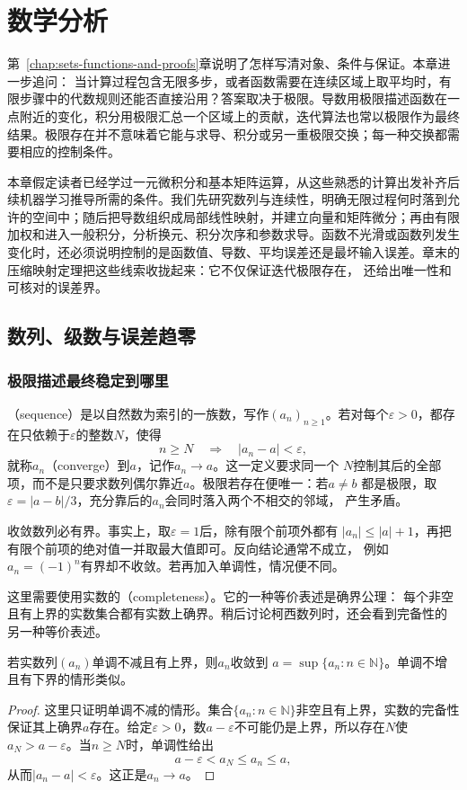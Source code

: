 \chapter{数学分析}
\label{chap:mathematical-analysis}

第~\ref{chap:sets-functions-and-proofs}章说明了怎样写清对象、条件与保证。本章进一步追问： 当计算过程包含无限多步，或者函数需要在连续区域上取平均时，有限步骤中的代数规则还能否直接沿用？答案取决于极限。导数用极限描述函数在一点附近的变化，积分用极限汇总一个区域上的贡献，迭代算法也常以极限作为最终结果。极限存在并不意味着它能与求导、积分或另一重极限交换；每一种交换都需要相应的控制条件。

本章假定读者已经学过一元微积分和基本矩阵运算，从这些熟悉的计算出发补齐后续机器学习推导所需的条件。我们先研究数列与连续性，明确无限过程何时落到允许的空间中；随后把导数组织成局部线性映射，并建立向量和矩阵微分；再由有限加权和进入一般积分，分析换元、积分次序和参数求导。函数不光滑或函数列发生变化时，还必须说明控制的是函数值、导数、平均误差还是最坏输入误差。章末的压缩映射定理把这些线索收拢起来：它不仅保证迭代极限存在， 还给出唯一性和可核对的误差界。
\section{数列、级数与误差趋零}
\label{sec:analysis-sequences-series-errors}
\subsection{极限描述最终稳定到哪里}

（sequence）是以自然数为索引的一族数，写作$(a_n)_{n\geq 1}$。若对每个$\varepsilon>0$，都存在只依赖于$\varepsilon$的整数$N$，使得
\[   n\geq N\quad\Longrightarrow\quad |a_n-a|<\varepsilon, \]
就称$a_n$（converge）到$a$，记作$a_n\to a$。这一定义要求同一个 $N$控制其后的全部项，而不是只要求数列偶尔靠近$a$。极限若存在便唯一：若$a\neq b$ 都是极限，取$\varepsilon=|a-b|/3$，充分靠后的$a_n$会同时落入两个不相交的邻域， 产生矛盾。

收敛数列必有界。事实上，取$\varepsilon=1$后，除有限个前项外都有 $|a_n|\leq |a|+1$，再把有限个前项的绝对值一并取最大值即可。反向结论通常不成立， 例如$a_n=(-1)^n$有界却不收敛。若再加入单调性，情况便不同。

这里需要使用实数的（completeness）。它的一种等价表述是确界公理：
每个非空且有上界的实数集合都有实数上确界。稍后讨论柯西数列时，还会看到完备性的
另一种等价表述。
\begin{theorem}[单调有界收敛定理]
\label{thm:analysis-monotone-bounded-sequence}
若实数列$(a_n)$单调不减且有上界，则$a_n$收敛到 $a=\sup\{a_n:n\in\mathbb{N}\}$。单调不增且有下界的情形类似。
\end{theorem}
\begin{proof}
这里只证明单调不减的情形。集合$\{a_n:n\in\mathbb{N}\}$非空且有上界，实数的完备性保证其上确界$a$存在。给定$\varepsilon>0$，数$a-\varepsilon$不可能仍是上界，所以存在$N$使$a_N>a-\varepsilon$。当$n\geq N$时，单调性给出
\[   a-\varepsilon<a_N\leq a_n\leq a, \]
从而$|a_n-a|<\varepsilon$。这正是$a_n\to a$。
\end{proof}

